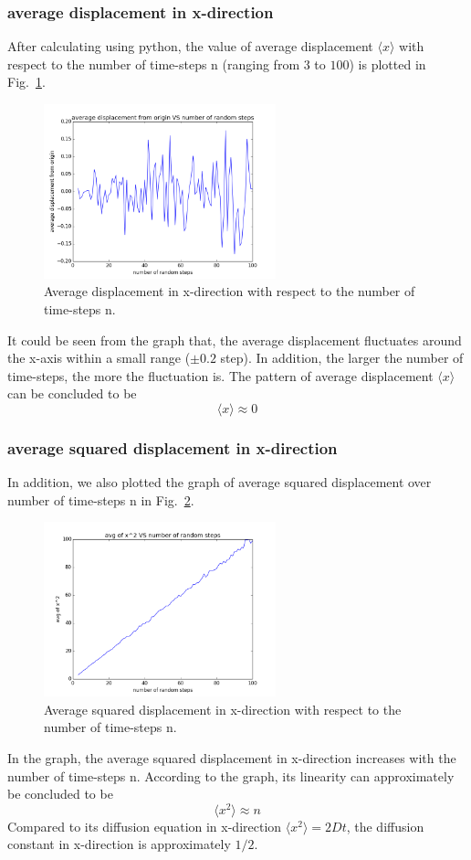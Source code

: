 \documentclass[a4paper,12pt]{article}
\begin{document}
\subsubsection{average displacement in x-direction}
After calculating using python, the value of average displacement $\langle x \rangle$ with respect to the number of time-steps n (ranging from $3$ to $100$) is plotted in Fig.~\ref{Fig:xavg}. \\
\begin{figure}[!htb]
 \centering
  \includegraphics[width=0.6\textwidth]{pics/xavg.png}
  \caption{Average displacement in x-direction with respect to the number of time-steps n.}
  \label{Fig:xavg}
\end{figure}
It could be seen from the graph that, the average displacement fluctuates around the x-axis within a small range ($\pm 0.2$ step). In addition, the larger the number of time-steps, the more the fluctuation is. The pattern of average displacement $\langle x \rangle$ can be concluded to be $$\langle x \rangle \approx 0$$

\subsubsection{average squared displacement in x-direction}
In addition, we also plotted the graph of average squared displacement over number of time-steps n in Fig.~\ref{Fig:x2avg}. \\
\begin{figure}[!htb]
  \centering
  \includegraphics[width=0.6\textwidth]{pics/x2avg.png}
  \caption{Average squared displacement in x-direction with respect to the number of time-steps n.}
  \label{Fig:x2avg}
\end{figure}
In the graph, the average squared displacement in x-direction increases with the number of time-steps n. According to the graph, its linearity can approximately be concluded to be $$\langle x^2 \rangle \approx n$$ Compared to its diffusion equation in x-direction $\langle x^2 \rangle = 2Dt$, the diffusion constant in x-direction is approximately $1/2$.
\end{document}
